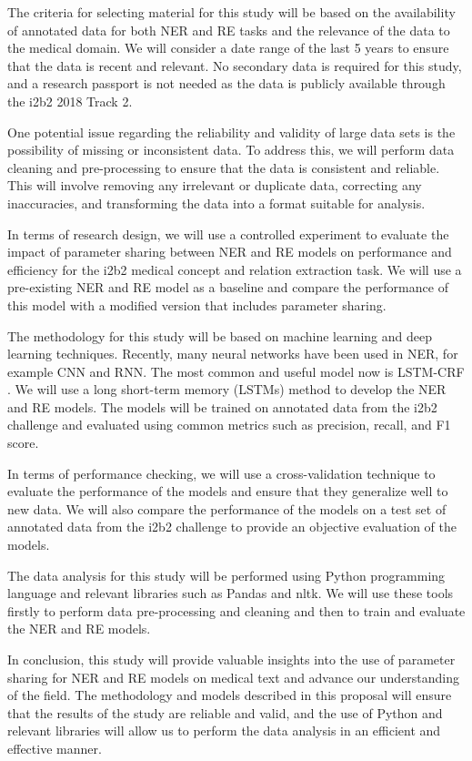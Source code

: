\documentclass{article}
\begin{document}
The criteria for selecting material for this study will be based on the availability of annotated data for both NER and RE tasks and the relevance of the data to the medical domain. We will consider a date range of the last 5 years to ensure that the data is recent and relevant. No secondary data is required for this study, and a research passport is not needed as the data is publicly available through the i2b2 2018 Track 2.

One potential issue regarding the reliability and validity of large data sets is the possibility of missing or inconsistent data. To address this, we will perform data cleaning and pre-processing to ensure that the data is consistent and reliable. This will involve removing any irrelevant or duplicate data, correcting any inaccuracies, and transforming the data into a format suitable for analysis.

In terms of research design, we will use a controlled experiment to evaluate the impact of parameter sharing between NER and RE models on performance and efficiency for the i2b2 medical concept and relation extraction task. We will use a pre-existing NER and RE model as a baseline and compare the performance of this model with a modified version that includes parameter sharing.

The methodology for this study will be based on machine learning and deep learning techniques. Recently, many neural networks have been used in NER, for example CNN and RNN. The most common and useful model now is LSTM-CRF \cite{huang_xu_yu_2015}. We will use a long short-term memory (LSTMs) method \cite{miwa_bansal} to develop the NER and RE models. The models will be trained on annotated data from the i2b2 challenge and evaluated using common metrics such as precision, recall, and F1 score.

In terms of performance checking, we will use a cross-validation technique to evaluate the performance of the models and ensure that they generalize well to new data. We will also compare the performance of the models on a test set of annotated data from the i2b2 challenge to provide an objective evaluation of the models.

The data analysis for this study will be performed using Python programming language and relevant libraries such as Pandas and nltk. We will use these tools firstly to perform data pre-processing and cleaning and then to train and evaluate the NER and RE models.

In conclusion, this study will provide valuable insights into the use of parameter sharing for NER and RE models on medical text and advance our understanding of the field. The methodology and models described in this proposal will ensure that the results of the study are reliable and valid, and the use of Python and relevant libraries will allow us to perform the data analysis in an efficient and effective manner.
\end{document}
